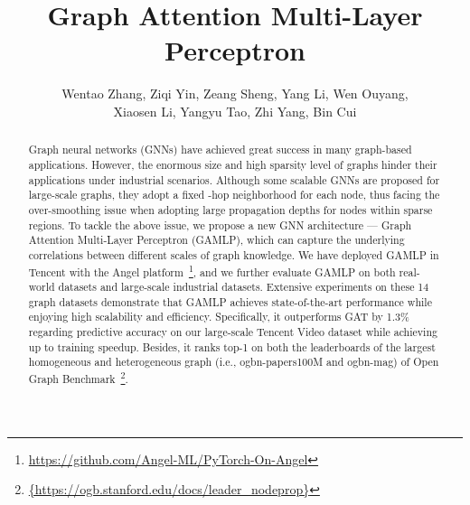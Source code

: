 \documentclass[sigconf]{acmart}
\newcommand{\sys}{\textsc{GAMLP}\xspace}
\newcommand{\blue}[1]{\textcolor{blue}{#1}}
\begin{document}
\fancyhead{}
\title{Graph Attention Multi-Layer Perceptron}

\author{Wentao Zhang, Ziqi Yin, Zeang Sheng, Yang Li, Wen Ouyang, \\Xiaosen Li, Yangyu Tao, 
Zhi Yang, 
Bin Cui}
\renewcommand{\shortauthors}{WT Zhang, et al.}
\renewcommand{\authors}{Wentao Zhang, Ziqi Yin, Zeang Sheng, Yang Li, Wen Ouyang, Xiaosen Li, Yangyu Tao, Zhi Yang, and Bin Cui}
\renewcommand{\shortauthors}{Wentao Zhang, et al.}

\begin{abstract}
Graph neural networks (GNNs) have achieved great success in many graph-based applications. However, the enormous size and high sparsity level of graphs hinder their applications under industrial scenarios.
Although some scalable GNNs are proposed for large-scale graphs, they adopt a fixed -hop neighborhood for each node, thus facing the over-smoothing issue when adopting large propagation depths for nodes within sparse regions.
To tackle the above issue, we propose a new GNN architecture --- Graph Attention Multi-Layer Perceptron (GAMLP), which can capture the underlying correlations between different scales of graph knowledge.
We have deployed \sys in Tencent with the Angel platform~\footnote{\blue{\url{https://github.com/Angel-ML/PyTorch-On-Angel}}}, and we further evaluate GAMLP on both real-world datasets and large-scale industrial datasets.
Extensive experiments on these 14 graph datasets demonstrate that GAMLP achieves state-of-the-art performance while enjoying high scalability and efficiency. 
Specifically, it outperforms GAT by 1.3\% regarding predictive accuracy on our large-scale Tencent Video dataset while achieving up to  training speedup.
Besides, it ranks top-1 on both the leaderboards of the largest homogeneous and heterogeneous graph (i.e., ogbn-papers100M and ogbn-mag) of Open Graph Benchmark~\footnote{\blue{\url{{https://ogb.stanford.edu/docs/leader\_nodeprop}}}}.
\end{abstract}
\end{document}
